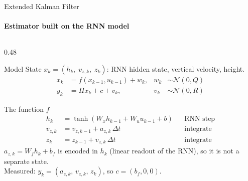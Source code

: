 
\begin{frame}{Extended Kalman Filter}
    \framesubtitle{Estimator built on the RNN model}

    \begin{columns}[T,onlytextwidth]
        \begin{column}{0.48\textwidth}
            \begin{block}{Model}
                \footnotesize
                State $x_k = (h_k,\; v_{z,k},\; z_k)$: RNN hidden state,
                vertical velocity, height.
                \setlength{\abovedisplayskip}{3pt}\setlength{\belowdisplayskip}{0pt}
                \begin{align*}
                    x_k &= f(x_{k-1},u_{k-1}) + w_k, & w_k &\sim \mathcal{N}(0,Q)\\
                    y_k &= H x_k + c + v_k, & v_k &\sim \mathcal{N}(0,R)
                \end{align*}
            \end{block}

            \begin{block}{The function $f$}
                \footnotesize
                \setlength{\abovedisplayskip}{0pt}\setlength{\belowdisplayskip}{2pt}
                \begin{align*}
                    h_k &= \tanh(W_x h_{k-1} + W_u u_{k-1} + b) && \text{RNN step}\\
                    v_{z,k} &= v_{z,k-1} + a_{z,k}\,\Delta t && \text{integrate}\\
                    z_k &= z_{k-1} + v_{z,k}\,\Delta t && \text{integrate}
                \end{align*}
                $a_{z,k} = W_f h_k + b_f$ is encoded in $h_k$ (linear readout
                of the RNN), so it is not a separate state.\\
                Measured: $y_k=(a_{z,k},\, v_{z,k},\, z_k)$, so $c=(b_f, 0, 0)$.
            \end{block}
        \end{column}


\end{columns}
\end{frame}
